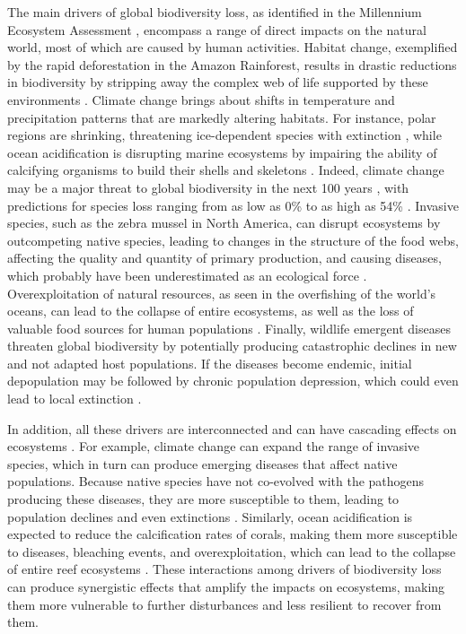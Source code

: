 The main drivers of global biodiversity loss, as identified in the Millennium
Ecosystem Assessment \cite{MEA2005}, encompass a range of
direct impacts on the natural world, most of which are caused by human
activities. Habitat change, exemplified by the rapid deforestation in the
Amazon Rainforest, results in drastic reductions in biodiversity by stripping
away the complex web of life supported by these environments
\cite{Laurance2012}. Climate change brings about shifts in temperature and
precipitation patterns that are markedly altering habitats. For instance, polar
regions are shrinking, threatening ice-dependent species with extinction
\cite{Post2013}, while ocean acidification is disrupting marine ecosystems by
impairing the ability of calcifying organisms to build their shells and
skeletons \cite{kroeker2013impacts}. Indeed, climate change may be a major
threat to global biodiversity in the next 100 years
\cite{Thomas2004,Loarie2009,Pimm2009,Warren2013,Warren2018}, with
predictions for species loss ranging from as low as 0\% to as high as 54\%
\cite{Urban2015}. Invasive species, such as the zebra mussel in North America,
can disrupt ecosystems by outcompeting native species, leading to changes in
the structure of the food webs, affecting the quality and quantity of primary
production, and causing diseases, which probably have been underestimated as an
ecological force \cite{Strayer2010}. Overexploitation of natural
resources, as seen in the overfishing of the world's oceans, can lead to the
collapse of entire ecosystems, as well as the loss of valuable food sources for
human populations \cite{Dayton1995,Coleman2002}. Finally, wildlife emergent
diseases threaten global biodiversity by potentially producing catastrophic
declines in new and not adapted host populations. If the diseases become
endemic, initial depopulation may be followed by chronic population depression,
which could even lead to local extinction \cite{Daszak2000}.


In addition, all these drivers are interconnected and can have cascading
effects
on ecosystems \cite{Mora2007}. For example, climate change can expand the range
of invasive species, which in turn can produce emerging diseases that affect
native populations. Because native species have not co-evolved with the
pathogens producing these diseases, they are more susceptible to them, leading
to population declines and even extinctions \cite{Daszak2000}. Similarly,
ocean acidification is expected to reduce the calcification rates of corals,
making them more susceptible to diseases, bleaching events, and
overexploitation, which can lead to the collapse of entire reef ecosystems
\cite{Guldberg2007}. These interactions among drivers of biodiversity
loss can produce synergistic effects that amplify the impacts on ecosystems,
making them more vulnerable to further disturbances and less resilient to
recover from them.

